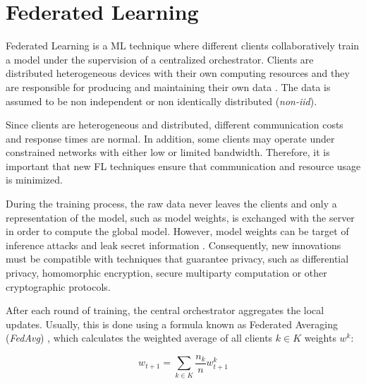 

\section{Federated Learning}\label{fundamentals:federated_learning}

Federated Learning is a ML technique where different clients collaboratively train a model under the supervision of a centralized orchestrator. Clients are distributed heterogeneous devices with their own computing resources and they are responsible for producing and maintaining their own data \cite{9084352}. The data is assumed to be non independent or non identically distributed (\textit{non-iid}).

Since clients are heterogeneous and distributed, different communication costs and response times are normal. In addition, some clients may operate under constrained networks with either low or limited bandwidth. Therefore, it is important that new FL techniques ensure that communication and resource usage is minimized.

During the training process, the raw data never leaves the clients and only a representation of the model, such as model weights, is exchanged with the server in order to compute the global model. However, model weights can be target of inference attacks and leak secret information \cite{10.1145/3298981}.  Consequently, new innovations must be compatible with techniques that guarantee privacy, such as differential privacy, homomorphic encryption, secure multiparty computation or other cryptographic protocols.

After each round of training, the central orchestrator aggregates the local updates. Usually, this is done using a formula known as Federated Averaging (\textit{FedAvg}) \cite{10.48550/arxiv.1602.05629}, which calculates the weighted average of all clients $k \in K$ weights $w^k$:

\begin{equation}
w_{t+1} = \sum_{k \in K} \frac{n_k}{n} w_{t+1}^k
\end{equation} \label{eq:fedavg}

